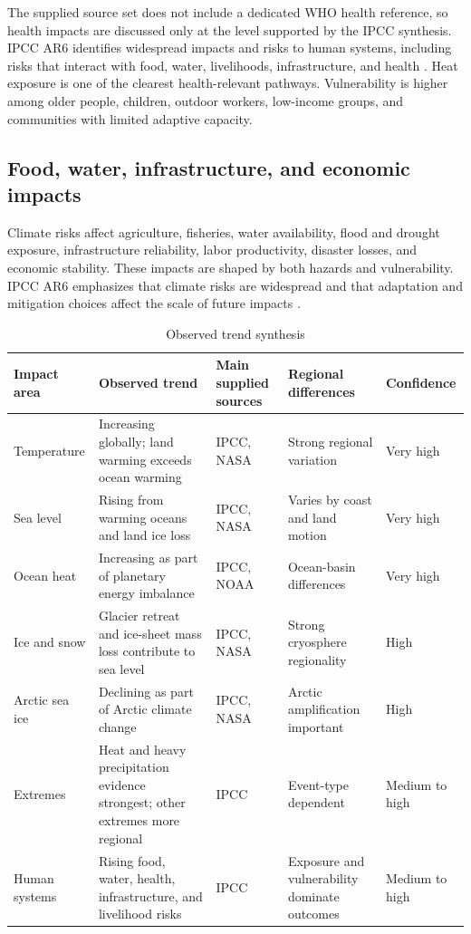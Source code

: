 \documentclass[12pt]{article}
\begin{document}
The supplied source set does not include a dedicated WHO health reference, so health impacts are discussed only at the level supported by the IPCC synthesis. IPCC AR6 identifies widespread impacts and risks to human systems, including risks that interact with food, water, livelihoods, infrastructure, and health \cite{ref1,ref6}. Heat exposure is one of the clearest health-relevant pathways. Vulnerability is higher among older people, children, outdoor workers, low-income groups, and communities with limited adaptive capacity.

\subsection{Food, water, infrastructure, and economic impacts}

Climate risks affect agriculture, fisheries, water availability, flood and drought exposure, infrastructure reliability, labor productivity, disaster losses, and economic stability. These impacts are shaped by both hazards and vulnerability. IPCC AR6 emphasizes that climate risks are widespread and that adaptation and mitigation choices affect the scale of future impacts \cite{ref1,ref6}.

\begin{table}[htbp]
\centering
\caption{Observed trend synthesis}
\begin{tabularx}{\textwidth}{p{2.8cm}Yp{2.8cm}p{3cm}p{2.2cm}}
\toprule
Impact area & Observed trend & Main supplied sources & Regional differences & Confidence \\
\midrule
Temperature & Increasing globally; land warming exceeds ocean warming & IPCC, NASA & Strong regional variation & Very high \\
Sea level & Rising from warming oceans and land ice loss & IPCC, NASA & Varies by coast and land motion & Very high \\
Ocean heat & Increasing as part of planetary energy imbalance & IPCC, NOAA & Ocean-basin differences & Very high \\
Ice and snow & Glacier retreat and ice-sheet mass loss contribute to sea level & IPCC, NASA & Strong cryosphere regionality & High \\
Arctic sea ice & Declining as part of Arctic climate change & IPCC, NASA & Arctic amplification important & High \\
Extremes & Heat and heavy precipitation evidence strongest; other extremes more regional & IPCC & Event-type dependent & Medium to high \\
Human systems & Rising food, water, health, infrastructure, and livelihood risks & IPCC & Exposure and vulnerability dominate outcomes & Medium to high \\
\bottomrule
\end{tabularx}
\end{table}
\end{document}
